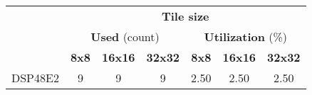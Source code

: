 \begin{tabular}{|c|c|c|c|c|c|c|}
\cline{2-7}
\multicolumn{1}{c|}{} & \multicolumn{6}{c|}{\textbf{Tile size}} \\
\cline{2-7}
\multicolumn{1}{c|}{} & \multicolumn{3}{c|}{\textbf{Used} (count)} & \multicolumn{3}{c|}{\textbf{Utilization} (\%)} \\
\cline{2-7}
\multicolumn{1}{c|}{} & \textbf{8x8} & \textbf{16x16} & \textbf{32x32} & \textbf{8x8} & \textbf{16x16} & \textbf{32x32} \\
\hline
\multicolumn{1}{|l|}{DSP48E2}  & 9 & 9 & 9  & 2.50 & 2.50 & 2.50 \\
\hline
\end{tabular}
